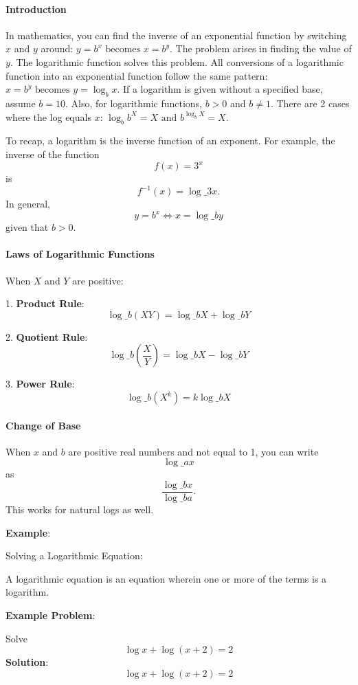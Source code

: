 \paragraph{Introduction}

In mathematics, you can find the inverse of an exponential function by switching $x$ and $y$ around: $y = b^x \text{ becomes } x = b^y$.  The problem arises in finding the value of $y$. The logarithmic function solves this problem. All conversions of a logarithmic function into an exponential function follow the same pattern:  $x = b^y \text{ becomes } y = \log_b x$.  If a logarithm is given without a specified base, assume $b = 10$. Also, for logarithmic functions, $b > 0$ and $b \neq 1$. There are 2 cases where the log equals $x$:  $\log_b b^X = X \text{ and } b^{\log_b X} = X$.

To recap, a logarithm is the inverse function of an exponent. For example, the inverse of the function 
$$
f(x) = 3^x
$$
is 
$$
f^{-1}(x) = \log\_3 x.
$$
In general,
$$
y = b^x \iff x = \log\_b y
$$
given that $b > 0$.

\paragraph{Laws of Logarithmic Functions}

When $X$ and $Y$ are positive:

1. \textbf{Product Rule}:
   $$
   \log\_b (XY) = \log\_b X + \log\_b Y
   $$

2. \textbf{Quotient Rule}:
   $$
   \log\_b \left(\frac{X}{Y}\right) = \log\_b X - \log\_b Y
   $$

3. \textbf{Power Rule}:
   $$
   \log\_b (X^k) = k \log\_b X
   $$

\paragraph{Change of Base}

When $x$ and $b$ are positive real numbers and not equal to 1, you can write 
$$
\log\_a x
$$
as 
$$
\frac{\log\_b x}{\log\_b a}.
$$
This works for natural logs as well. 

\textbf{Example}:

Solving a Logarithmic Equation:

A logarithmic equation is an equation wherein one or more of the terms is a logarithm. 

\textbf{Example Problem}:

Solve
$$
\log x + \log(x+2) = 2
$$
\textbf{Solution}:
$$
\log x + \log(x+2) = 2
$$

